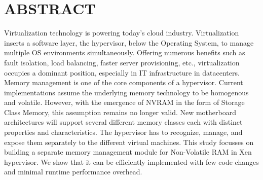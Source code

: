 %
%
%

\chapter*{ABSTRACT}

\pagestyle{plain} %
\setcounter{page}{2}

\indent 
Virtualization  technology is powering today's cloud industry. Virtualization inserts a software layer, the hypervisor, below the  Operating System, to manage multiple OS environments simultaneously. Offering numerous benefits such as fault isolation, load balancing, faster server provisioning, etc., virtualization occupies a dominant position, especially in IT infrastructure in datacenters. Memory management is one of the core components of a hypervisor. Current implementations assume the underlying memory technology to be homogenous and volatile. However, with the emergence of NVRAM in the form of Storage Class Memory, this assumption remains no longer valid. New motherboard architectures will support several different memory classes each with distinct properties and characteristics. The hypervisor has to recognize, manage, and expose them separately to the different virtual machines. This study focusses on building a separate memory management module for Non-Volatile RAM in Xen hypervisor. We  show that it can be efficiently implemented with few code changes and minimal runtime performance overhead.
